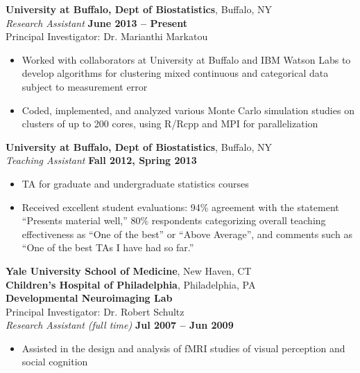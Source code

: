 \documentclass{article}
\begin{document}
 {\bf University at Buffalo, Dept of Biostatistics}, Buffalo, NY\\
 {\it Research Assistant} \hfill {\bf June 2013 -- Present} \\
 Principal Investigator: Dr. Marianthi Markatou 
 \begin{itemize} \itemsep -2pt
  \item Worked with collaborators at University at Buffalo and IBM Watson Labs to develop algorithms for clustering mixed continuous and categorical data subject to measurement error
  \item Coded, implemented, and analyzed various Monte Carlo simulation studies on clusters of up to 200 cores, using R/Rcpp and MPI for parallelization
 \end{itemize}

 {\bf University at Buffalo, Dept of Biostatistics}, Buffalo, NY\\
 {\it Teaching Assistant} \hfill {\bf Fall 2012, Spring 2013}
 \begin{itemize} \itemsep -2pt
  \item TA for graduate and undergraduate statistics courses
  \item Received excellent student evaluations: 94\% agreement with the statement ``Presents material well,'' 80\% respondents categorizing overall teaching effectiveness as ``One of the best'' or ``Above Average'', and comments such as ``One of the best TAs I have had so far.''
 \end{itemize}
 

 {\bf Yale University School of Medicine}, New Haven, CT\\
 {\bf Children's Hospital of Philadelphia}, Philadelphia, PA\\
 {\bf Developmental Neuroimaging Lab}\\
 Principal Investigator: Dr. Robert Schultz\\
 {\it Research Assistant (full time)} \hfill {\bf Jul 2007 -- Jun 2009}
 \begin{itemize} \itemsep -2pt
  \item Assisted in the design and analysis of fMRI studies of
        visual perception and social cognition
 \end{itemize}
\end{document}
